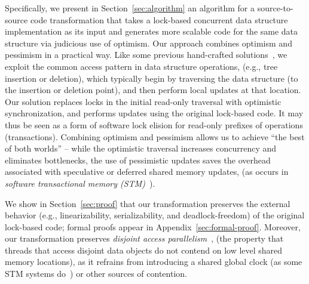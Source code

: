 Specifically, we present in Section~\ref{sec:algorithm} an algorithm for a source-to-source
code transformation that takes a lock-based concurrent data structure implementation as its input
and generates more scalable code for the same data structure via judicious use of optimism.
Our approach combines optimism and pessimism in a practical way.
Like some previous hand-crafted solutions~\cite{LazyList}, 
we exploit the common access pattern in data structure operations,
(e.g., tree insertion or deletion), which typically begin by traversing the data structure (to the insertion or deletion point), and then perform local updates at that location.
Our solution replaces locks in the initial read-only traversal with optimistic synchronization, and performs updates using the original lock-based code. It
may thus be seen as a form of software lock elision for read-only prefixes of operations (transactions).
%
Combining optimism and pessimism allows us to achieve ``the best of both worlds'' -- 
while the
optimistic traversal increases concurrency and eliminates bottlenecks,
the use of pessimistic updates saves the overhead associated with speculative or deferred shared
memory updates, (as occurs in \emph{software transactional memory (STM)}~\cite{HLR:SLCA2010}).
%


We show in Section~\ref{sec:proof} that our transformation preserves the external behavior (e.g., linearizability, serializability, and deadlock-freedom) of the original lock-based code; formal proofs appear in Appendix~\ref{sec:formal-proof}.
Moreover, our transformation preserves 
\emph{disjoint access parallelism}~\cite{Israeli:1994:DIS:197917.198079}, (the property that threads 
that access disjoint data objects do not contend on low level shared memory locations), as it
refrains from introducing a shared global clock (as some STM systems do~\cite{DBLP:conf/eurosys/ShalevS06}) or other sources of contention. 


